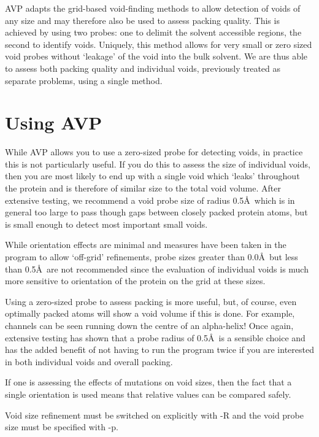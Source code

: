 \documentclass{article}
\begin{document}
AVP adapts the grid-based void-finding methods to allow detection of
voids of any size and may therefore also be used to assess packing
quality.  This is achieved by using two probes: one to delimit the
solvent accessible regions, the second to identify voids.  Uniquely,
this method allows for very small or zero sized void probes without
`leakage' of the void into the bulk solvent. We are thus able to
assess both packing quality and individual voids, previously treated
as separate problems, using a single method.

\section{Using AVP}

While AVP allows you to use a zero-sized probe for detecting voids, in
practice this is not particularly useful. If you do this to assess the
size of individual voids, then you are most likely to end up with a
single void which `leaks' throughout the protein and is therefore of
similar size to the total void volume. After extensive testing, we
recommend a void probe size of radius 0.5\AA\ which is in general 
too large to pass though gaps between closely packed protein atoms,
but is small enough to detect most important small voids. 

While orientation effects are minimal and measures have been taken in
the program to allow `off-grid' refinements, probe sizes greater than
0.0\AA\ but less than 0.5\AA\ are not recommended since the evaluation
of individual voids is much more sensitive to orientation of the
protein on the grid at these sizes.

Using a zero-sized probe to assess packing is more useful, but, of
course, even optimally packed atoms will show a void volume if this is
done. For example, channels can be seen running down the centre of an
alpha-helix! Once again, extensive testing has shown that a probe
radius of 0.5\AA\ is a sensible choice and has the added benefit of
not having to run the program twice if you are interested in both
individual voids and overall packing.

If one is assessing the effects of mutations on void sizes, then the
fact that a single orientation is used means that relative values can
be compared safely.

Void size refinement must be switched on explicitly with -R and the
void probe size must be specified with -p.
\end{document}

